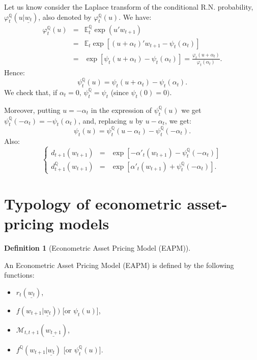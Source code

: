 \documentclass[
  12pt,
]{book}
\providecommand{\tightlist}{%
  \setlength{\itemsep}{0pt}\setlength{\parskip}{0pt}}
\theoremstyle{definition}
\newtheorem{definition}{Definition}[chapter]
\theoremstyle{definition}
\theoremstyle{definition}
\theoremstyle{definition}
\theoremstyle{remark}
\begin{document}
Let us know consider the Laplace transform of the conditional R.N. probability, \(\varphi^{\mathbb{Q}}_t(u|\underline{w_t})\), also denoted by \(\varphi^{\mathbb{Q}}_t(u)\). We have:
\begin{eqnarray*}
\varphi^{\mathbb{Q}}_t(u) &=& \mathbb{E}^{\mathbb{Q}}_t \exp(u' w_{t+1}) \\
&=& \mathbb{E}_t \exp[(u+\alpha_t)'w_{t+1}-\psi_t(\alpha_t)] \\
&=& \exp[\psi_t(u+\alpha_t)-\psi_t(\alpha_t)] =
\frac{\varphi_t(u+\alpha_t)}{\varphi_t(\alpha_t)}.
\end{eqnarray*}
Hence:
\begin{equation}
\boxed{\psi^{\mathbb{Q}}_t(u) = \psi_t(u+\alpha_t)-\psi_t(\alpha_t).}\label{eq:transfoPQ}
\end{equation}
We check that, if \(\alpha_t=0\), \(\psi^{\mathbb{Q}}_t=\psi_t\) (since \(\psi_t(0)=0)\).

Moreover, putting \(u=-\alpha_t\) in the expression of
\(\psi^{\mathbb{Q}}_t(u)\) we get \(\psi^{\mathbb{Q}}_t(-\alpha_t)=-\psi_t(\alpha_t)\),
and, replacing \(u\) by \(u-\alpha_t\), we get:
\[
\boxed{\psi_t(u) = \psi^{\mathbb{Q}}_t(u-\alpha_t)-\psi^{\mathbb{Q}}_t(-\alpha_t).}
\]
Also:
\begin{equation*}
\left\{
\begin{array}{ccl}
d_{t+1}(w_{t+1}) &=& \exp[-\alpha'_t(w_{t+1})-\psi^{\mathbb{Q}}_t(-\alpha_t)] \\
d^{\mathbb{Q}}_{t+1}(w_{t+1}) &=& \exp[\alpha'_t(w_{t+1})+\psi^{\mathbb{Q}}_t(-\alpha_t)].
\end{array}
\right.
\end{equation*}

\hypertarget{PricingTypology}{%
\section{Typology of econometric asset-pricing models}\label{PricingTypology}}

\begin{definition}[Econometric Asset Pricing Model (EAPM)]
\protect\hypertarget{def:typo}{}\label{def:typo}

An Econometric Asset Pricing Model (EAPM) is defined by the following functions:

\begin{itemize}
\tightlist
\item
  \(r_{t}(\underline{w_t})\),
\item
  \(f(w_{t+1}|\underline{w_t}))\) {[}or \(\psi_t(u)\){]},
\item
  \(\mathcal{M}_{t,t+1}(\underline{w_{t+1}})\),
\item
  \(f^{\mathbb{Q}}(w_{t+1}|\underline{w_t})\) {[}or \(\psi^{\mathbb{Q}}_t(u)\){]}.
\end{itemize}

\end{definition}
\end{document}
